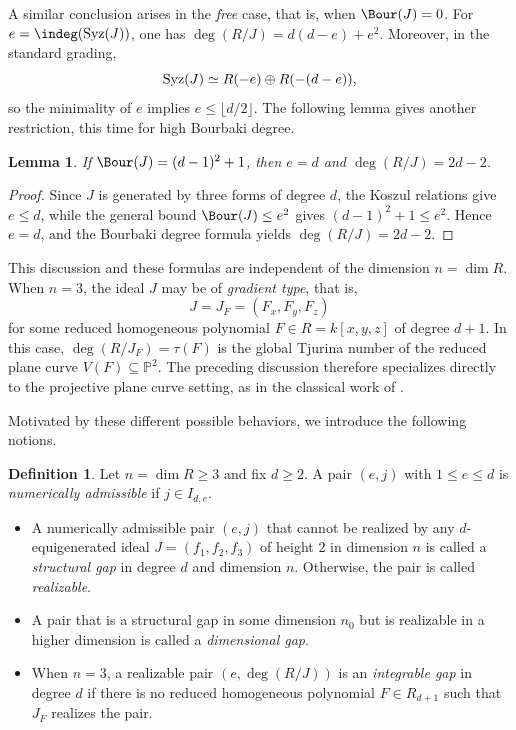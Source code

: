 \documentclass[11pt]{amsart} %
\newtheorem{Lemma}[Theorem]{Lemma}
\theoremstyle{definition}
\newtheorem{Definition}[Theorem]{Definition}
\def\syz{\mbox{\rm Syz}}
\def\NZQ{\mathbb}               %
\def\PP{{\NZQ P}}
\begin{document}
A similar conclusion arises in the \emph{free} case, that is, when
$\Bour(J)=0$. For $e=\indeg(\syz(J))$, one has
$\deg(R/J)=d(d-e)+e^2$. Moreover, in the standard grading,
\[
\syz(J)\simeq R(-e)\oplus R(-(d-e)),
\]
so the minimality of $e$ implies $e\le\lfloor d/2\rfloor$. The following
lemma gives another restriction, this time for high Bourbaki degree.

\begin{Lemma}\label{numerical-reduction}
If $\Bour(J)=(d-1)^2+1$, then $e=d$ and $\deg(R/J)=2d-2$.
\end{Lemma}

\begin{proof}
Since $J$ is generated by three forms of degree $d$, the Koszul
relations give $e\le d$, while the general bound $\Bour(J)\le e^2$
gives $(d-1)^2+1\le e^2$. Hence $e=d$, and the Bourbaki degree formula
yields $\deg(R/J)=2d-2$.
\end{proof}

This discussion and these formulas are independent of the dimension
$n=\dim R$. When $n=3$, the ideal $J$ may be of \emph{gradient type},
that is,
\[
J=J_F=(F_x,F_y,F_z)
\]
for some reduced homogeneous polynomial $F\in R=k[x,y,z]$ of degree
$d+1$. In this case, $\deg(R/J_F)=\tau(F)$ is the global Tjurina number
of the reduced plane curve $V(F)\subseteq\PP^2$. The preceding
discussion therefore specializes directly to the projective plane curve
setting, as in the classical work of \cite[Section~4]{CTC-Plessis}.

Motivated by these different possible behaviors, we introduce the
following notions.

\begin{Definition}\label{defi:gaps}
Let $n=\dim R\ge3$ and fix $d\ge2$. A pair $(e,j)$ with $1\le e\le d$
is \emph{numerically admissible} if $j\in I_{d,e}$.
\begin{itemize}
\item[(a)] A numerically admissible pair $(e,j)$ that cannot be realized
by any $d$-equigenerated ideal $J=(f_1,f_2,f_3)$ of height $2$ in
dimension $n$ is called a \emph{structural gap} in degree $d$ and
dimension $n$. Otherwise, the pair is called \emph{realizable}.

\item[(b)] A pair that is a structural gap in some dimension $n_0$ but
is realizable in a higher dimension is called a \emph{dimensional gap}.

\item[(c)] When $n=3$, a realizable pair $(e,\deg(R/J))$ is an
\emph{integrable gap} in degree $d$ if there is no reduced homogeneous
polynomial $F\in R_{d+1}$ such that $J_F$ realizes the pair.
\end{itemize}
\end{Definition}
\end{document}
